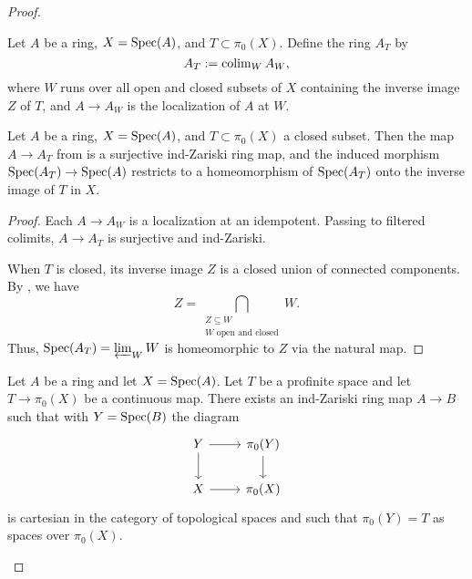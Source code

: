 \begin{proof}
\begin{definition}
  \label{def:colim-open-closed-localizations}
  Let $A$ be a ring, $X = \operatorname{Spec}(A)$, and $T \subset \pi_0(X)$. Define the ring $A_T$ by
  \[ 
    A_T := \operatorname{colim}_{W} A_W,
  \]
  where $W$ runs over all open and closed subsets of $X$ containing the inverse image $Z$ of $T$, and $A \to A_W$ is the localization of $A$ at $W$.
\end{definition}

\begin{lemma}
  \label{thm:colim-open-closed-localizations-surj-ind-zariski}
  Let $A$ be a ring, $X = \operatorname{Spec}(A)$, and $T \subset \pi_0(X)$ a closed subset. Then the map $A \to A_T$ from  is a surjective ind-Zariski ring map, and the induced morphism $\operatorname{Spec}(A_T) \to \operatorname{Spec}(A)$ restricts to a homeomorphism of $\operatorname{Spec}(A_T)$ onto the inverse image of $T$ in $X$.
\end{lemma}

\begin{proof}
  Each $A \to A_W$ is a localization at an idempotent. Passing to filtered colimits, $A \to A_T$ is surjective and ind-Zariski.

  When $T$ is closed, its inverse image $Z$ is a closed union of connected components. By , we have
  \[
    Z = \bigcap_{\substack{Z \subseteq W \\ W \text{ open and closed}}} W.
  \]
  Thus, $\operatorname{Spec}(A_T) = \varprojlim_W W$ is homeomorphic to $Z$ via the natural map.
\end{proof}

\begin{lemma}
  Let $A$ be a ring and let $X = \operatorname{Spec} (A)$. Let $T$ be a profinite space and let $T \to \pi_0(X)$ be a continuous map. There exists an ind-Zariski ring map $A \to B$ such that with $Y = \operatorname{Spec} (B)$ the diagram
  \[
  \begin{tikzcd}
  Y \arrow[r] \arrow[d] & \pi_0(Y) \arrow[d] \\
  X \arrow[r] & \pi_0(X)
  \end{tikzcd}
  \]
  is cartesian in the category of topological spaces and such that $\pi_0(Y) = T$ as spaces over $\pi_0(X)$.
  \label{thm:exists-ind-Zariski-cartesian}
\end{lemma}


\end{proof}
